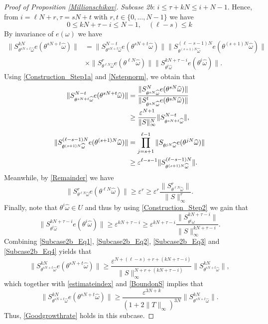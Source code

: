 \documentclass[pdflatex,sn-mathphys-num]{sn-jnl}%
\theoremstyle{thmstyleone}%
\theoremstyle{thmstyletwo}%
\theoremstyle{thmstylethree}%
\newcommand{\eps}{\varepsilon}
\numberwithin{equation}{section}
\begin{document}
\begin{proof}[Proof of Proposition \ref{Millionschikov}]
\emph{Subcase 2b}: $i\leq \tau+kN\leq i+N-1$. Hence, from $i=\ell N+r, \tau=sN+t$ with $r,t\in \{0,\dots,N-1\}$ we have 
\begin{equation}\label{estimateindex}
0\leq kN+\tau-i\leq N-1,\quad (\ell-s)\leq k    
\end{equation}
By invariance of $e(\omega)$ we have 
\begin{align*}
\|S^{kN}_{\theta^{sN+t}\widehat\omega}e(\theta^{sN+t}\widehat\omega)\|
&=\|S^{N-t}_{\theta^{sN+t}\widehat\omega}e(\theta^{sN+t}\widehat\omega)\|\|S^{(\ell-s-1)N}_{\theta^{(s+1)N}\widehat\omega}e(\theta^{(s+1)N}\widehat\omega)\|\\[1ex]
&\times
\|S^{r}_{\theta^{\ell N}\widehat\omega}e(\theta^{\ell N}\widehat\omega)\|\|S^{kN+\tau-i}_{\theta^i\widehat\omega}e(\theta^i\widehat\omega)\|.
\end{align*}
Using \eqref{Construction_Step1a} and  \eqref{Nstepnorm}, we obtain that 
\begin{align}
\|S^{N-t}_{\theta^{sN+t}\widehat\omega}e(\theta^{sN+t}\widehat\omega)\|
&= \frac{\|S^{N}_{\theta^{sN}\widehat\omega}e(\theta^{sN}\widehat\omega)\|}{\|S^{t}_{\theta^{sN}\widehat\omega}e(\theta^{sN}\widehat\omega)\|}\notag\\
&\geq \frac{\eps^{N+1}}{\|S\|_{\infty}^N}\|S^{N-t}_{\theta^{sN+t}\widehat\omega}\|,\label{Subcase2b_Eq1}\\[1ex]
\|S^{(\ell-s-1)N}_{\theta^{(s+1)N}\widehat\omega}e(\theta^{(s+1)N}\widehat\omega)\|
&=\prod_{j=s+1}^{\ell-1}\|S_{\theta^{jN}\widehat\omega}e(\theta^{jN}\widehat\omega)\|\notag\\
&\geq 
\eps^{\ell-s-1} \|S^{(\ell-s-1)N}_{\theta^{(s+1)N}\widehat\omega}\|\label{Subcase2b_Eq2}.
\end{align}
Meanwhile, by \eqref{Remainder} we have 
\begin{equation}\label{Subcase2b_Eq3}
\|S^{r}_{\theta^{\ell N}\widehat\omega}e(\theta^{\ell N}\widehat\omega)\|
\geq \eps^r\geq \eps^r \frac{\|S^{r}_{\theta^{\ell N}\widehat\omega}\|}{\|S\|_{\infty}^r}.
\end{equation}
Finally, note that $\theta^i\widehat\omega\in U$ and thus by using \eqref{Construction_Step2} we gain that 
\begin{equation}\label{Subcase2b_Eq4}
\|S^{kN+\tau-i}_{\theta^i\widehat\omega}e(\theta^i\widehat\omega)\|\geq \eps^{kN+\tau-i}
\geq \eps^{kN+\tau-i}\frac{\|S^{kN+\tau-i}_{\theta^i\widehat\omega}\|}{\|S\|_{\infty}^{kN+\tau-i}}.
\end{equation}
Combining \eqref{Subcase2b_Eq1}, \eqref{Subcase2b_Eq2}, \eqref{Subcase2b_Eq3} and \eqref{Subcase2b_Eq4} yields that \[
\|S^{kN}_{\theta^{sN+t}\widehat\omega}e(\theta^{sN+t}\widehat\omega)\|
\geq 
\frac{\eps^{N+(\ell-s)+r+(kN+\tau-i)}}{\|S\|_{\infty}^{N+r+(kN+\tau-i)}}\|S^{kN}_{\theta^{sN+t}\widehat\omega}\|,
\]
which together with \eqref{estimateindex} and \eqref{BoundonS} implies that 
\[
\|S^{kN}_{\theta^{sN+t}\widehat\omega}e(\theta^{sN+t}\widehat\omega)\|
\geq 
\frac{\eps^{3N+k}}{(1+2\|T\|_{\infty})^{3N}}\|S^{kN}_{\theta^{sN+t}\widehat\omega}\|.
\]
Thus, \eqref{Goodgrowthrate} holds in this subcase. 


\end{proof}
\end{document}

